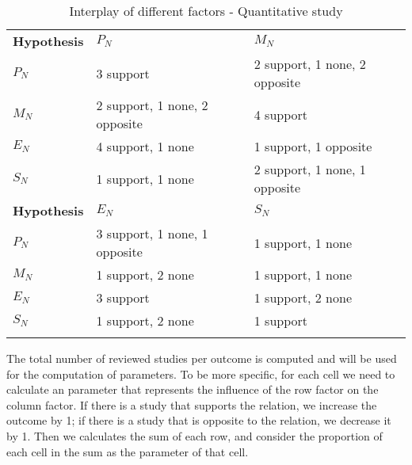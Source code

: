 \documentclass{mcmthesis}
\newlength\savedwidth
\newcommand\whline{\noalign{\global\savedwidth\arrayrulewidth
		\global\arrayrulewidth 1.2pt}%
	\hline
	\noalign{\global\arrayrulewidth\savedwidth}}
\newlength\savewidth
\newcommand\shline{\noalign{\global\savewidth\arrayrulewidth
		\global\arrayrulewidth 1.2pt}%
	\hline
	\noalign{\global\arrayrulewidth\savewidth}}
\begin{document}
	\begin{table}[htbp]
		\renewcommand\arraystretch{1.5}
		\footnotesize
		\centering
		\begin{tabular}{m{2.7cm}<{\centering}|m{5cm}<{\centering}|m{5cm}<{\centering}}
			\whline
			\textbf{Hypothesis}&\textbf{$P_N$}&\textbf{$M_N$}\\
			\whline
			\textbf{$P_N$}&3 support &2 support, 1 none, 2 opposite\\
			
			\textbf{$M_N$}&2 support, 1 none, 2 opposite&4 support\\
			
			\textbf{$E_N$}&4 support, 1 none&1 support, 1 opposite\\
			
			\textbf{$S_N$}&1 support, 1 none&2 support, 1 none, 1 opposite\\
			\shline
			\textbf{Hypothesis}&\textbf{$E_N$}&\textbf{$S_N$}\\
			\whline
			\textbf{$P_N$}& 3 support, 1 none, 1 opposite & 1 support, 1 none\\
			
			\textbf{$M_N$}&1 support, 2 none&1 support, 1 none\\
			
			\textbf{$E_N$}&3 support&1 support, 2 none\\
			
			\textbf{$S_N$}&1 support, 2 none&1 support\\
			\shline
		\end{tabular}
		\caption{Interplay of different factors - Quantitative study}\label{tab:Interplay of different factors - Quantitative study}
	\end{table}
	The total number of reviewed studies per outcome is computed and will be used for the computation of parameters. To be more specific, for each cell we need to calculate an parameter that represents the influence of the row factor on the column factor. If there is a study that supports the relation, we increase the outcome by 1; if there is a study that is opposite to the relation, we decrease it by 1. Then we calculates the sum of each row, and consider the proportion of each cell in the sum as the parameter of that cell. 
	
\end{document}
